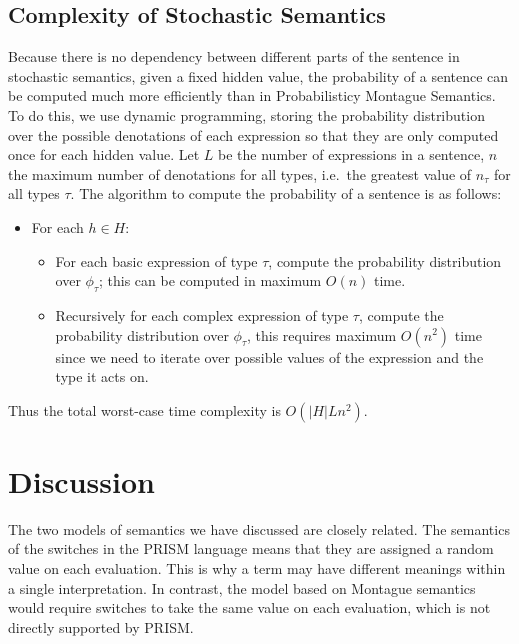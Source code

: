 \documentclass[11pt]{article}
\theoremstyle{definition}
\begin{document}
\subsection{Complexity of Stochastic Semantics}

Because there is no dependency between different parts of the sentence
in stochastic semantics, given a fixed hidden value, the probability
of a sentence can be computed much more efficiently than in
Probabilisticy Montague Semantics. To do this, we use dynamic
programming, storing the probability distribution over the possible
denotations of each expression so that they are only computed once for
each hidden value. Let $L$ be the number of expressions in a sentence,
$n$ the maximum number of denotations for all types, i.e.~the greatest
value of $n_\tau$ for all types $\tau$. The algorithm to compute the
probability of a sentence is as follows:
\begin{itemize}
\item For each $h\in H$:
\begin{itemize}
\item For each basic expression of type $\tau$, compute the
  probability distribution over $\phi_\tau$; this can be computed in
  maximum $O(n)$ time.
\item Recursively for each complex expression of type $\tau$, compute
  the probability distribution over $\phi_\tau$, this requires maximum
  $O(n^2)$ time since we need to iterate over possible values of the
  expression and the type it acts on.
\end{itemize}
\end{itemize}
Thus the total worst-case time complexity is $O(|H|Ln^2)$.

\section{Discussion}

The two models of semantics we have discussed are closely
related.
The semantics
of the switches in the PRISM language means that they are assigned
a random value on each evaluation. This is why a term may have different meanings
within a single interpretation. In contrast, the model based on
Montague semantics would require switches to take the same value on
each evaluation, which is not directly supported by PRISM.
\end{document}
